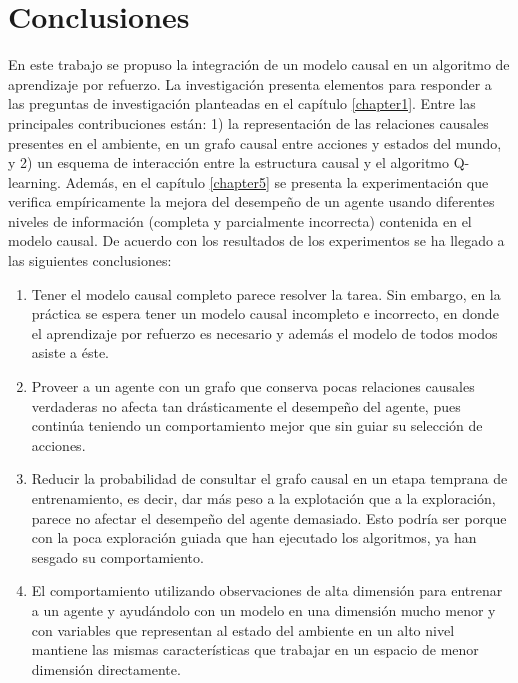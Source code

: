 \chapter{Conclusiones}\label{chapter6}

\graphicspath{{Chapter5/Figs/}}

En este trabajo se propuso la integración de un modelo causal en un
algoritmo de aprendizaje por refuerzo.
La investigación presenta
elementos para responder a las preguntas de investigación planteadas en el capítulo \ref{chapter1}. Entre las principales contribuciones están: 1) la representación de las relaciones causales presentes en el ambiente, en un grafo causal entre acciones y estados del mundo, y 2) un esquema de interacción entre la estructura causal y el algoritmo Q-learning. 
Además, en el capítulo \ref{chapter5} se presenta la experimentación que verifica empíricamente
    la mejora del desempeño de un agente usando diferentes niveles de información (completa y parcialmente incorrecta) contenida en el modelo causal. De acuerdo con los resultados de los experimentos 
    se ha llegado a las siguientes conclusiones:
    
\begin{enumerate}
    \item Tener el modelo causal completo parece resolver la tarea. Sin embargo, en la práctica se espera tener un modelo causal incompleto e incorrecto, en donde el aprendizaje por refuerzo es necesario y además el modelo de todos modos asiste a éste.
    \item Proveer a un agente con un grafo que conserva pocas relaciones
    causales verdaderas no afecta tan drásticamente el desempeño del agente, pues 
    continúa teniendo un comportamiento mejor que sin guiar su selección de acciones.
    \item Reducir la probabilidad de consultar el grafo causal en un etapa 
    temprana de entrenamiento, es decir, dar más peso a la explotación que a la exploración, parece no afectar el desempeño del agente demasiado. Esto podría
    ser porque con la poca exploración guiada que han ejecutado los algoritmos,
    ya han sesgado su comportamiento.
    
    \item El comportamiento utilizando observaciones de alta dimensión para entrenar a un agente y ayudándolo con un modelo en una dimensión mucho menor y con variables que representan al estado del ambiente en un alto nivel mantiene las mismas características que trabajar en un espacio de menor dimensión directamente.
\end{enumerate}

